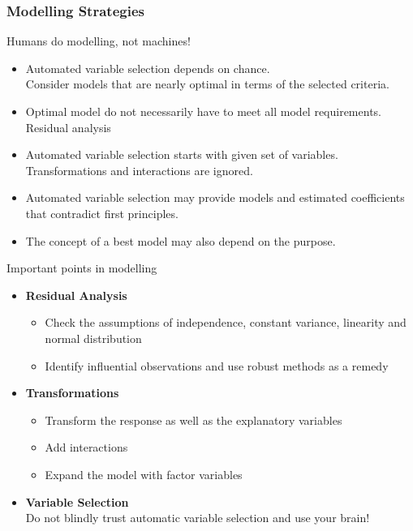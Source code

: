 \documentclass[11pt]{article}
\theoremstyle{definition}
\begin{document}
\subsubsection{Modelling Strategies}
Humans do modelling, not machines!
\begin{itemize}
	\item Automated variable selection depends on chance.\\
	Consider models that are nearly optimal in terms of the selected criteria.
	\item Optimal model do not necessarily have to meet all model requirements.\\
	Residual analysis
	\item Automated variable selection starts with given set of variables.\\
	Transformations and interactions are ignored.
	\item Automated variable selection may provide models and estimated coefficients that contradict first principles.
	\item The concept of a best model may also depend on the purpose.
\end{itemize}
Important points in modelling
\begin{itemize}
	\item \textbf{Residual Analysis}
	\begin{itemize}
		\item Check the assumptions of independence, constant variance, linearity and normal distribution
		\item Identify influential observations and use robust methods as a remedy
	\end{itemize}
	\item \textbf{Transformations}
	\begin{itemize}
		\item Transform the response as well as the explanatory variables
		\item Add interactions
		\item Expand the model with factor variables
	\end{itemize}
	\item \textbf{Variable Selection}\\
	Do not blindly trust automatic variable selection and use your brain!
\end{itemize}
\end{document}

